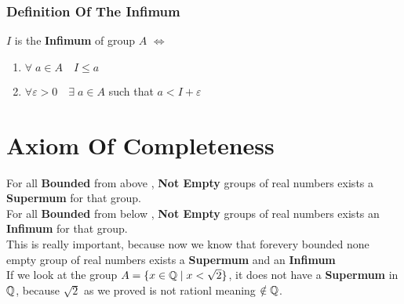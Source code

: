 \subsubsection{Definition Of The Infimum}
$I$ is the \textbf{Infimum} of group $A$ $\iff$ 
\begin{enumerate}
    \item $\forall \; a\in A \quad I\leq a$
    \item $\forall \varepsilon>0\quad \exists\; a\in A$ such that $a<I+\varepsilon$
\end{enumerate}

\section{Axiom Of Completeness}
For all \textbf{Bounded} from above , \textbf{Not Empty} groups of real numbers exists a \textbf{Supermum} for that group.\\
For all \textbf{Bounded} from below , \textbf{Not Empty} groups of real numbers exists an \textbf{Infimum} for that group.\\
This is really important, because now we know that forevery bounded none empty group of real numbers exists a \textbf{Supermum} and an \textbf{Infimum}\\
If we look at the group $A = \{x\in \mathbb{Q}\; | \; x<\sqrt{2}\}$, it does not have a \textbf{Supermum} in $\mathbb{Q}$, because $\sqrt{2}$ as we proved is not rationl meaning $\notin \mathbb{Q}$.\\
